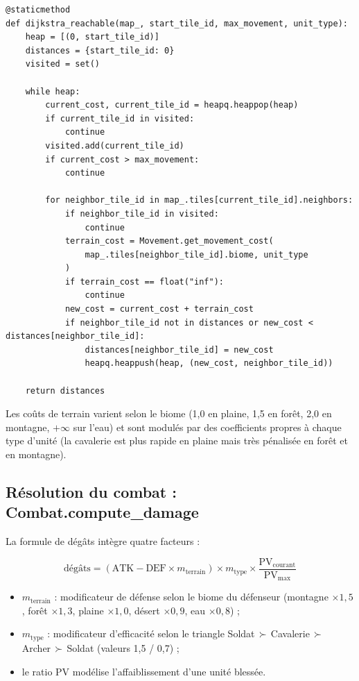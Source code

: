 \documentclass[12pt, a4paper]{article}
\begin{document}
\begin{lstlisting}[style=python, caption={Algorithme de Dijkstra pour le déplacement}]
@staticmethod
def dijkstra_reachable(map_, start_tile_id, max_movement, unit_type):
    heap = [(0, start_tile_id)]
    distances = {start_tile_id: 0}
    visited = set()

    while heap:
        current_cost, current_tile_id = heapq.heappop(heap)
        if current_tile_id in visited:
            continue
        visited.add(current_tile_id)
        if current_cost > max_movement:
            continue

        for neighbor_tile_id in map_.tiles[current_tile_id].neighbors:
            if neighbor_tile_id in visited:
                continue
            terrain_cost = Movement.get_movement_cost(
                map_.tiles[neighbor_tile_id].biome, unit_type
            )
            if terrain_cost == float("inf"):
                continue
            new_cost = current_cost + terrain_cost
            if neighbor_tile_id not in distances or new_cost < distances[neighbor_tile_id]:
                distances[neighbor_tile_id] = new_cost
                heapq.heappush(heap, (new_cost, neighbor_tile_id))

    return distances
\end{lstlisting}

Les coûts de terrain varient selon le biome (1,0 en plaine, 1,5 en forêt, 2,0 en montagne,
$+\infty$ sur l'eau) et sont modulés par des coefficients propres à chaque type d'unité
(la cavalerie est plus rapide en plaine mais très pénalisée en forêt et en montagne).

\subsection{Résolution du combat : Combat.compute\_damage}

La formule de dégâts intègre quatre facteurs :

\begin{equation}
    \text{dégâts} = (\text{ATK} - \text{DEF} \times m_\text{terrain}) \times m_\text{type} \times \frac{\text{PV}_\text{courant}}{\text{PV}_\text{max}}
\end{equation}

\begin{itemize}
    \item $m_\text{terrain}$ : modificateur de défense selon le biome du défenseur
    (montagne $\times 1{,}5$, forêt $\times 1{,}3$, plaine $\times 1{,}0$,
    désert $\times 0{,}9$, eau $\times 0{,}8$) ;
    \item $m_\text{type}$ : modificateur d'efficacité selon le triangle
    Soldat\,$\succ$\,Cavalerie\,$\succ$\,Archer\,$\succ$\,Soldat
    (valeurs 1,5 / 0,7) ;
    \item le ratio PV modélise l'affaiblissement d'une unité blessée.
\end{itemize}
\end{document}
